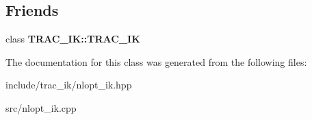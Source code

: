\subsection*{Friends}
\begin{DoxyCompactItemize}
\item 
class {\bfseries T\-R\-A\-C\-\_\-\-I\-K\-::\-T\-R\-A\-C\-\_\-\-I\-K}\label{class_n_l_o_p_t___i_k_1_1_n_l_o_p_t___i_k_a81945572f6a8b9dd1864f6433549689c}

\end{DoxyCompactItemize}


The documentation for this class was generated from the following files\-:\begin{DoxyCompactItemize}
\item 
include/trac\-\_\-ik/nlopt\-\_\-ik.\-hpp\item 
src/nlopt\-\_\-ik.\-cpp\end{DoxyCompactItemize}
